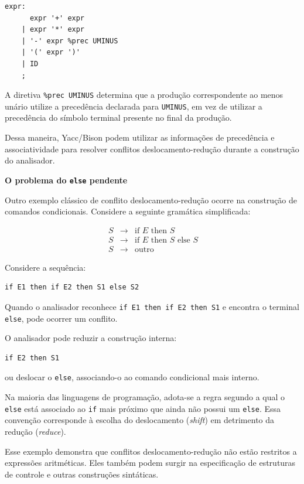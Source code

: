 \documentclass[
  brazilian,
  letterpaper,
]{book}
\theoremstyle{plain}
\theoremstyle{definition}
\theoremstyle{remark}
\begin{document}
\begin{verbatim}
expr:
      expr '+' expr
    | expr '*' expr
    | '-' expr %prec UMINUS
    | '(' expr ')'
    | ID
    ;
\end{verbatim}

A diretiva \texttt{\%prec\ UMINUS} determina que a produção
correspondente ao menos unário utilize a precedência declarada para
\texttt{UMINUS}, em vez de utilizar a precedência do símbolo terminal
presente no final da produção.

Dessa maneira, Yacc/Bison podem utilizar as informações de precedência e
associatividade para resolver conflitos deslocamento-redução durante a
construção do analisador.

\textbf{O problema do \texttt{else} pendente}

Outro exemplo clássico de conflito deslocamento-redução ocorre na
construção de comandos condicionais. Considere a seguinte gramática
simplificada:

\[
\begin{array}{rcl}\
S &\rightarrow& \text{if } E \text{ then } S\\\
S &\rightarrow& \text{if } E \text{ then } S \text{ else } S\\\
S &\rightarrow& \text{outro}\
\end{array}
\]

Considere a sequência:

\begin{verbatim}
if E1 then if E2 then S1 else S2
\end{verbatim}

Quando o analisador reconhece \texttt{if\ E1\ then\ if\ E2\ then\ S1} e
encontra o terminal \texttt{else}, pode ocorrer um conflito.

O analisador pode reduzir a construção interna:

\begin{verbatim}
if E2 then S1
\end{verbatim}

ou deslocar o \texttt{else}, associando-o ao comando condicional mais
interno.

Na maioria das linguagens de programação, adota-se a regra segundo a
qual o \texttt{else} está associado ao \texttt{if} mais próximo que
ainda não possui um \texttt{else}. Essa convenção corresponde à escolha
do deslocamento (\emph{shift}) em detrimento da redução (\emph{reduce}).

Esse exemplo demonstra que conflitos deslocamento-redução não estão
restritos a expressões aritméticas. Eles também podem surgir na
especificação de estruturas de controle e outras construções sintáticas.
\end{document}
